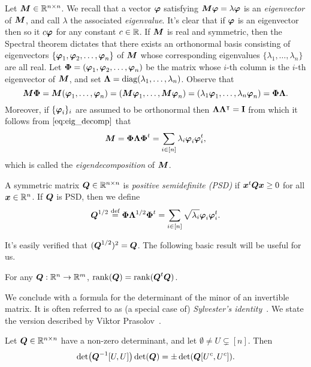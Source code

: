 Let ${\vb*{M}}\in\mathbb{R}^{n\times n}$. We recall that a vector $\vb*{\varphi}$ satisfying ${\vb*{M}}\vb*{\varphi}=\lambda\vb*{\varphi}$ is an \emph{eigenvector} of ${\vb*{M}}$, and call $\lambda$ the associated \emph{eigenvalue}. It's clear that if $\vb*{\varphi}$ is an eigenvector then so it $c\vb*{\varphi}$ for any constant $c\in \mathbb{R}$. If ${\vb*{M}}$ is real and symmetric, then the Spectral theorem dictates that there exists an orthonormal basis consisting of eigenvectors $\{\vb*{\varphi}_1,\vb*{\varphi}_2,\dots,\vb*{\varphi}_n\}$ of ${\vb*{M}}$ whose corresponding eigenvalues $\{\lambda_1,\dots,\lambda_n\}$ are all real. Let $\boldsymbol{\Phi}=(\vb*{\varphi}_1,\vb*{\varphi}_2,\dots,\vb*{\varphi}_n)$ be the matrix whose $i$-th column is the $i$-th eigenvector of ${\vb*{M}}$, and set $\vb{\Lambda}=\text{diag}(\lambda_1,\dots,\lambda_n)$. Observe that 
\begin{equation}
\label{eq:eig_decomp}
{\vb*{M}}\boldsymbol{\Phi}={\vb*{M}}(\vb*{\varphi}_1,\dots,\vb*{\varphi}_n)=({\vb*{M}}\vb*{\varphi}_1,\dots,{\vb*{M}}\vb*{\varphi}_n)=(\lambda_1\vb*{\varphi}_1,\dots,\lambda_n\vb*{\varphi}_n)=\boldsymbol{\Phi}\vb{\Lambda}.
\end{equation}
Moreover, if $\{\vb*{\varphi}_i\}_i$ are assumed to be orthonormal then $\vb{\Lambda}\vb{\Lambda}^\intercal=\vb{I}$ from which it follows from $\eqref{eq:eig_decomp}$ that \begin{equation}
    \label{eq:eig_decomp2}
    {\vb*{M}}=\boldsymbol{\Phi}\vb{\Lambda}\boldsymbol{\Phi}^t = \sum_{i\in[n]}\lambda_i\vb*{\varphi}_i\vb*{\varphi}_i^t,
\end{equation}
which is called the \emph{eigendecomposition} of ${\vb*{M}}$. 

A symmetric matrix $\vb*{Q}\in\mathbb{R}^{n\times n}$ is \emph{positive semidefinite (PSD)} if $\vb*{x}^t\vb*{Q}\vb*{x} \geq 0$ for all $\vb*{x}\in\mathbb{R}^n$. If $\vb*{Q}$ is PSD, then we define 
\begin{equation*}
    \vb*{Q}^{1/2} \overset{\text{def}}{=} \boldsymbol{\Phi}\vb{\Lambda}^{1/2}\boldsymbol{\Phi}^t = \sum_{i\in[n]}\sqrt{\lambda_i}\vb*{\varphi}_i\vb*{\varphi}_i^t.
\end{equation*}

It's easily verified that $(\vb*{Q}^{1/2})^2 = \vb*{Q}$. The following basic result will be useful for us. 

\begin{lemma}
	\label{lem:rank(QtQ)}
	For any $\vb*{Q}:\mathbb{R}^n\to\mathbb{R}^m$, $\rank(\vb*{Q}) = \rank(\vb*{Q}^t\vb*{Q})$. 
\end{lemma}

We conclude with a formula for  the determinant of the minor of an invertible matrix.  It is often referred to as (a special  case of) \emph{Sylvester's identity}~\cite{sylvester1851xxxvii}. We state the version described by Viktor Prasolov~\cite{prasolov1994problems}. 

\begin{lemma}
	\label{lem:sylvester}
	Let $\vb*{Q}\in\mathbb{R}^{n\times n}$ have a non-zero determinant, and let $\emptyset\neq U\subsetneq[n]$. Then 
	\begin{equation}
	\label{eq:sylvester}
	\det(\vb*{Q}^{-1}[U,U]) \det(\vb*{Q}) = \pm \det(\vb*{Q}[U^c,U^c]). 
	\end{equation}
\end{lemma}



